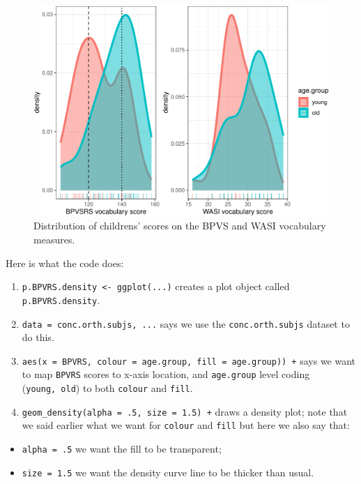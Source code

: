 \documentclass[
  letterpaper,
  DIV=11,
  numbers=noendperiod]{scrreprt}
\providecommand{\tightlist}{%
  \setlength{\itemsep}{0pt}\setlength{\parskip}{0pt}}\usepackage{longtable,booktabs,array}
\begin{document}
\begin{figure}[H]

{\centering \includegraphics{visualization_files/figure-pdf/fig-density-BPVS-WASI-1.pdf}

}

\caption{\label{fig-density-BPVS-WASI}Distribution of childrens' scores
on the BPVS and WASI vocabulary measures.}

\end{figure}

Here is what the code does:

\begin{enumerate}
\def\labelenumi{\arabic{enumi}.}
\tightlist
\item
  \texttt{p.BPVRS.density\ \textless{}-\ ggplot(...)} creates a plot
  object called \texttt{p.BPVRS.density}.
\item
  \texttt{data\ =\ conc.orth.subjs,\ ...} says we use the
  \texttt{conc.orth.subjs} dataset to do this.
\item
  \texttt{aes(x\ =\ BPVRS,\ colour\ =\ age.group,\ fill\ =\ age.group))\ +}
  says we want to map \texttt{BPVRS} scores to x-axis location, and
  \texttt{age.group} level coding (\texttt{young,\ old}) to both
  \texttt{colour} and \texttt{fill}.
\item
  \texttt{geom\_density(alpha\ =\ .5,\ size\ =\ 1.5)\ +} draws a density
  plot; note that we said earlier what we want for \texttt{colour} and
  \texttt{fill} but here we also say that:
\end{enumerate}

\begin{itemize}
\tightlist
\item
  \texttt{alpha\ =\ .5} we want the fill to be transparent;
\item
  \texttt{size\ =\ 1.5} we want the density curve line to be thicker
  than usual.
\end{itemize}
\end{document}
